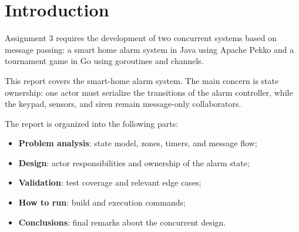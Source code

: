 \section{Introduction}

Assignment 3 requires the development of two concurrent systems based on message passing: a smart home alarm system in
Java using Apache Pekko and a tournament game in Go using goroutines and channels.

This report covers the smart-home alarm system. The main concern is state ownership: one actor must serialize the
transitions of the alarm controller, while the keypad, sensors, and siren remain message-only collaborators.

The report is organized into the following parts:

\begin{itemize}
    \item \textbf{Problem analysis}: state model, zones, timers, and message flow;
    \item \textbf{Design}: actor responsibilities and ownership of the alarm state;
    \item \textbf{Validation}: test coverage and relevant edge cases;
    \item \textbf{How to run}: build and execution commands;
    \item \textbf{Conclusions}: final remarks about the concurrent design.
\end{itemize}
